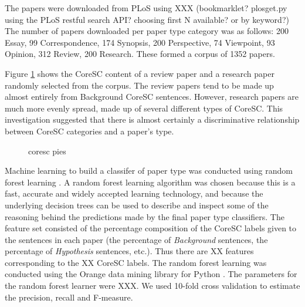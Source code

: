 \documentclass{svmult}
\begin{document}
The papers were downloaded from PLoS using XXX (bookmarklet? plosget.py using the PLoS restful search API? choosing first N available? or by keyword?)
The number of papers downloaded per paper type category was as follows: 200 Essay, 99 Correspondence, 174 Synopsis, 200 Perspective, 74 Viewpoint, 93 Opinion, 312 Review, 200 Research.
These formed a corpus of 1352 papers.

Figure \ref{fig:coresc_pies} shows the CoreSC content of a review paper and a research paper randomly selected from the corpus. 
The review papers tend to be made up almost entirely from Background CoreSC sentences. 
However, research papers are much more evenly spread, made up of several different types of CoreSC. 
This investigation suggested that there is almost certainly a discriminative relationship between CoreSC categories and a paper's type. 


\begin{figure}[t]
\sidecaption[t]
%
%
\caption{coresc pies}
\label{fig:coresc_pies} 
\end{figure}


Machine learning to build a classifer of paper type was conducted using random forest learning \cite{Breiman2001}. 
A random forest learning algorithm was chosen because this is a fast, accurate and widely accepted learning technology, and because the underlying decision trees can be used to describe and inspect some of the reasoning behind the predictions made by the final paper type classifiers.
The feature set consisted of the percentage composition of the CoreSC labels given to the sentences in each paper (the percentage of {\em Background} sentences, the percentage of {\em Hypothesis} sentences, etc.). 
Thus there are XX features corresponding to the XX CoreSC labels.
The random forest learning was conducted using the Orange data mining library for Python \cite{Curk2005}.
The parameters for the random forest learner were XXX.  
We used 10-fold cross validation to estimate the precision, recall and F-measure.
\end{document}
